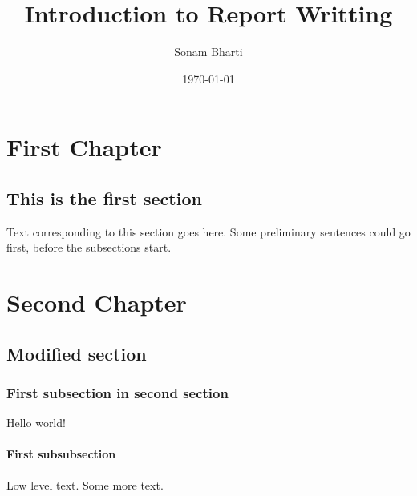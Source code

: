 \documentclass[12pt,one word]{report}
\title{Introduction to Report Writting}
\author{Sonam Bharti}
\date{\today}
\begin{document}
\maketitle
\tableofcontents
\chapter{First Chapter}
\section{This is the first section}
Text corresponding to this section goes here.  Some preliminary
sentences could go first, before the subsections start. 
\chapter{Second Chapter}
\section{Modified section}




\subsection{First subsection in second section}
Hello world!


\subsubsection{First subsubsection}
Low level text.  Some more text.
\appendix
\chapter{}
\end{document}
